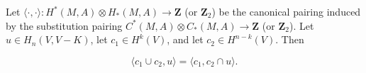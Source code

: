 Let $\langle \cdot, \cdot \rangle: H^*(M, A) \otimes H_*(M, A) \to \mathbf{Z}$ (or $\mathbf{Z}_2$) be the canonical pairing induced by the substitution pairing $C^*(M, A) \otimes C_*(M, A) \to \mathbf{Z}$ (or $\mathbf{Z}_2$). Let $u \in H_n(V, V - K)$, let $c_1 \in H^k(V)$, and let $c_2 \in H^{n-k}(V)$. Then

$$\langle c_1 \cup c_2, u \rangle = \langle c_1, c_2 \cap u \rangle.$$
